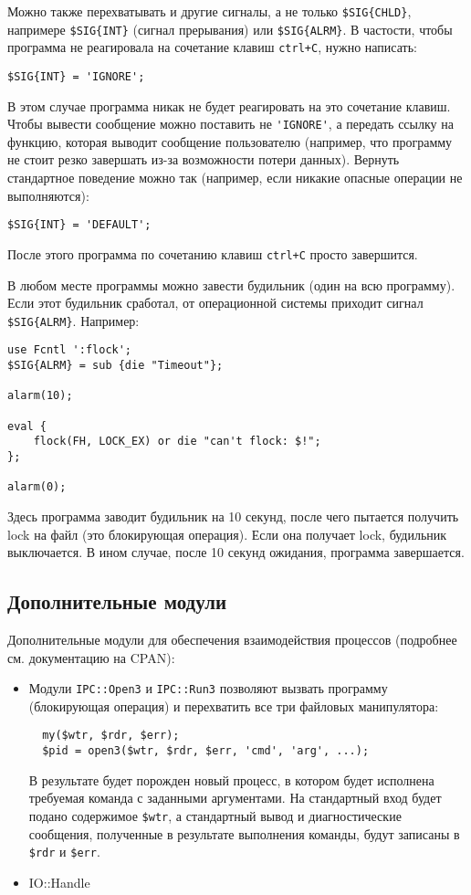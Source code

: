 Можно также перехватывать и другие сигналы, а не только \verb|$SIG{CHLD}|, напримере \verb|$SIG{INT}| (сигнал прерывания) или \verb|$SIG{ALRM}|. В частости, чтобы программа не реагировала на сочетание клавиш \verb|ctrl+C|, нужно написать:
\begin{verbatim}
$SIG{INT} = 'IGNORE';
\end{verbatim}
В этом случае программа никак не будет реагировать на это сочетание клавиш. Чтобы вывести сообщение можно поставить не \verb|'IGNORE'|, а передать ссылку на функцию, которая выводит сообщение пользователю (например, что программу не стоит резко завершать из-за возможности потери данных). Вернуть стандартное поведение можно так (например, если никакие опасные операции не выполняются):
\begin{verbatim}
$SIG{INT} = 'DEFAULT';
\end{verbatim}
После этого программа по сочетанию клавиш \verb|ctrl+C| просто завершится.

В любом месте программы можно завести будильник (один на всю программу). Если этот будильник сработал, от операционной системы приходит сигнал \verb|$SIG{ALRM}|. Например:
\begin{verbatim}
use Fcntl ':flock';
$SIG{ALRM} = sub {die "Timeout"};

alarm(10);

eval {
    flock(FH, LOCK_EX) or die "can't flock: $!";
};

alarm(0);
\end{verbatim}
Здесь программа заводит будильник на 10 секунд, после чего пытается получить lock на файл (это блокирующая операция). Если она получает lock, будильник выключается. В ином случае, после 10 секунд ожидания, программа завершается.

\subsection{Дополнительные модули}
Дополнительные модули для обеспечения взаимодействия процессов (подробнее см. документацию на CPAN):
\begin{itemize}
  \item Модули \verb|IPC::Open3| и \verb|IPC::Run3| позволяют вызвать программу (блокирующая операция) и перехватить все три файловых манипулятора:
  \begin{verbatim}
  my($wtr, $rdr, $err);
  $pid = open3($wtr, $rdr, $err, 'cmd', 'arg', ...);
  \end{verbatim}
  В результате будет порожден новый процесс, в котором будет исполнена требуемая команда с заданными аргументами. На стандартный вход будет подано содержимое \verb|$wtr|, а стандартный вывод и диагностические сообщения, полученные в результате выполнения команды, будут записаны в \verb|$rdr| и \verb|$err|.
  \item IO::Handle
\end{itemize}

